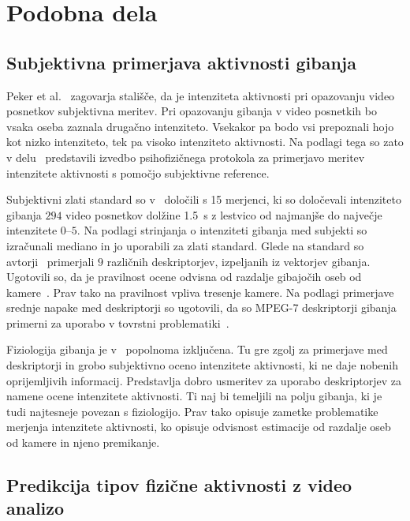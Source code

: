 \section{Podobna dela}\label{sec:podobna-dela}



\subsection{Subjektivna primerjava aktivnosti gibanja}\label{sec:subjektivna-primerjava}

Peker et al.~\cite{peker2004framework} zagovarja stališče, da je intenziteta aktivnosti pri opazovanju video posnetkov subjektivna meritev. Pri opazovanju gibanja v video posnetkih bo vsaka oseba zaznala drugačno intenziteto. Vsekakor pa bodo vsi prepoznali hojo kot nizko intenziteto, tek pa visoko intenziteto aktivnosti. Na podlagi tega so zato v delu~\cite{peker2004framework} predstavili izvedbo psihofizičnega protokola za primerjavo meritev intenzitete aktivnosti s pomočjo subjektivne reference.

Subjektivni zlati standard so v~\cite{peker2004framework} določili s 15 merjenci, ki so določevali intenziteto gibanja $294$ video posnetkov dolžine \SI{1.5}{\s} z lestvico od najmanjše do največje intenzitete $0$--$5$. Na podlagi strinjanja o intenziteti gibanja med subjekti so izračunali mediano in jo uporabili za zlati standard. Glede na standard so avtorji~\cite{peker2004framework} primerjali $9$ različnih deskriptorjev, izpeljanih iz vektorjev gibanja. Ugotovili so, da je pravilnost ocene odvisna od razdalje gibajočih oseb od kamere~\cite{peker2004framework}. Prav tako na pravilnost vpliva tresenje kamere. Na podlagi primerjave srednje napake med deskriptorji so ugotovili, da so MPEG-7 deskriptorji gibanja primerni za uporabo v tovrstni problematiki~\cite{peker2004framework}.

Fiziologija gibanja je v~\cite{peker2004framework} popolnoma izključena. Tu gre zgolj za primerjave med deskriptorji in grobo subjektivno oceno intenzitete aktivnosti, ki ne daje nobenih oprijemljivih informacij. Predstavlja dobro usmeritev za uporabo deskriptorjev za namene ocene intenzitete aktivnosti. Ti naj bi temeljili na polju gibanja, ki je tudi najtesneje povezan s fiziologijo. Prav tako opisuje zametke problematike merjenja intenzitete aktivnosti, ko opisuje odvisnost estimacije od razdalje oseb od kamere in njeno premikanje.




\subsection{Predikcija tipov fizične aktivnosti z video analizo}

